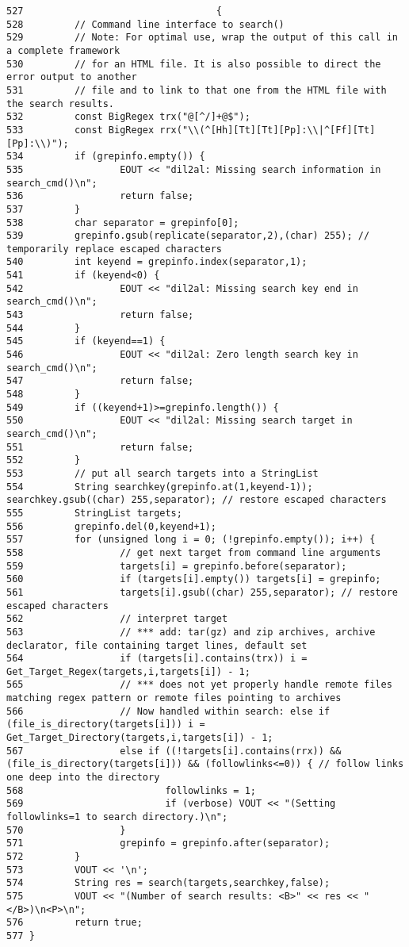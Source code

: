 \footnotesize\begin{verbatim}527                                  {
528         // Command line interface to search()
529         // Note: For optimal use, wrap the output of this call in a complete framework
530         // for an HTML file. It is also possible to direct the error output to another
531         // file and to link to that one from the HTML file with the search results.
532         const BigRegex trx("@[^/]+@$");
533         const BigRegex rrx("\\(^[Hh][Tt][Tt][Pp]:\\|^[Ff][Tt][Pp]:\\)");
534         if (grepinfo.empty()) {
535                 EOUT << "dil2al: Missing search information in search_cmd()\n";
536                 return false;
537         }
538         char separator = grepinfo[0];
539         grepinfo.gsub(replicate(separator,2),(char) 255); // temporarily replace escaped characters
540         int keyend = grepinfo.index(separator,1);
541         if (keyend<0) {
542                 EOUT << "dil2al: Missing search key end in search_cmd()\n";
543                 return false;
544         }
545         if (keyend==1) {
546                 EOUT << "dil2al: Zero length search key in search_cmd()\n";
547                 return false;
548         }
549         if ((keyend+1)>=grepinfo.length()) {
550                 EOUT << "dil2al: Missing search target in search_cmd()\n";
551                 return false;
552         }
553         // put all search targets into a StringList
554         String searchkey(grepinfo.at(1,keyend-1)); searchkey.gsub((char) 255,separator); // restore escaped characters
555         StringList targets;
556         grepinfo.del(0,keyend+1);
557         for (unsigned long i = 0; (!grepinfo.empty()); i++) {
558                 // get next target from command line arguments
559                 targets[i] = grepinfo.before(separator);
560                 if (targets[i].empty()) targets[i] = grepinfo;
561                 targets[i].gsub((char) 255,separator); // restore escaped characters
562                 // interpret target
563                 // *** add: tar(gz) and zip archives, archive declarator, file containing target lines, default set
564                 if (targets[i].contains(trx)) i = Get_Target_Regex(targets,i,targets[i]) - 1;
565                 // *** does not yet properly handle remote files matching regex pattern or remote files pointing to archives
566                 // Now handled within search: else if (file_is_directory(targets[i])) i = Get_Target_Directory(targets,i,targets[i]) - 1;
567                 else if ((!targets[i].contains(rrx)) && (file_is_directory(targets[i])) && (followlinks<=0)) { // follow links one deep into the directory
568                         followlinks = 1;
569                         if (verbose) VOUT << "(Setting followlinks=1 to search directory.)\n";
570                 }
571                 grepinfo = grepinfo.after(separator);
572         }
573         VOUT << '\n';
574         String res = search(targets,searchkey,false);
575         VOUT << "(Number of search results: <B>" << res << "</B>)\n<P>\n";
576         return true;
577 }
\end{verbatim}\normalsize 
